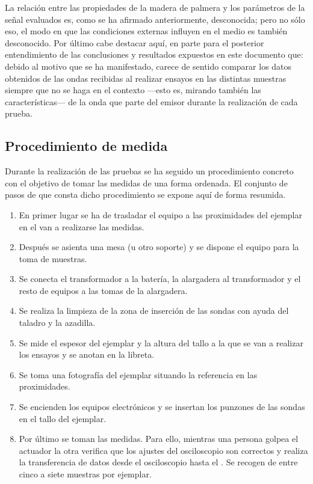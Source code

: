 La relación entre las propiedades de la madera de palmera y los parámetros
de la señal evaluados es, como se ha afirmado anteriormente, desconocida;
pero no sólo eso, el modo en que las condiciones externas influyen en el
medio es también desconocido. Por último cabe destacar aquí, en parte para
el posterior entendimiento de las conclusiones y resultados expuestos en
este documento que: debido al motivo que se ha manifestado, carece de
sentido comparar los datos obtenidos de las ondas recibidas al realizar
ensayos en las distintas muestras siempre que no se haga en el contexto
---esto es, mirando también las características--- de la onda que parte del
emisor durante la realización de cada prueba.


\subsection{Procedimiento de medida}

Durante la realización de las pruebas se ha seguido un procedimiento
concreto con el objetivo de tomar las medidas de una forma ordenada. El
conjunto de pasos de que consta dicho procedimiento se expone aquí de
forma resumida.

\begin{enumerate}
    \item En primer lugar se ha de trasladar el equipo a las proximidades
	del ejemplar en el van a realizarse las medidas.
    \item Después se asienta una mesa (u otro soporte) y se dispone el
	equipo para la toma de muestras.
    \item Se conecta el transformador a la batería, la alargadera al
	transformador y el resto de equipos a las tomas de la alargadera.
    \item Se realiza la limpieza de la zona de inserción de las sondas con
	ayuda del taladro y la azadilla.
    \item Se mide el espesor del ejemplar y la altura del tallo a la que se
	van a realizar los ensayos y se anotan en la libreta.
    \item Se toma una fotografía del ejemplar situando la referencia en las
	proximidades.
    \item Se encienden los equipos electrónicos y se insertan los punzones
	de las sondas en el tallo del ejemplar.
    \item Por último se toman las medidas. Para ello, mientras una persona
	golpea el actuador la otra verifica que los ajustes del
	osciloscopio son correctos y realiza la transferencia de datos
	desde el osciloscopio hasta el . Se recogen de entre cinco
	a siete muestras por ejemplar.
\end{enumerate}

